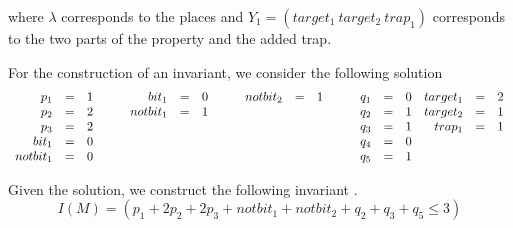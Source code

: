 \noindent where $\lambda$ corresponds to the places and $Y_1 = (target_1\ target_2\ trap_1)$
corresponds to the two parts of the property and the added trap.

For the construction of an invariant, we consider the
following solution
$$
\begin{array}[t]{rcl}
  p_1      & = & 1 \\
  p_2      & = & 2 \\
  p_3      & = & 2 \\
  bit_1    & = & 0 \\
  notbit_1 & = & 0
\end{array}
\qquad
\begin{array}[t]{rcl}
  bit_1    & = & 0 \\
  notbit_1 & = & 1
\end{array}
\qquad
\begin{array}[t]{rcl}
  notbit_2 & = & 1
\end{array}
\qquad
\begin{array}[t]{rcl}
  q_1   & = & 0 \\
  q_2   & = & 1 \\
  q_3   & = & 1 \\
  q_4   & = & 0 \\
  q_5   & = & 1 \\
\end{array}
\begin{array}[t]{rcl}
  target_1 & = & 2 \\
  target_2 & = & 1 \\
  trap_1   & = & 1
\end{array}
$$

Given the solution, we construct the following
invariant \invI.
$$
I(M) = (p_1 + 2 p_2 + 2 p_3 + notbit_1 + notbit_2 + q_2 + q_3 + q_5 \le 3)
$$

